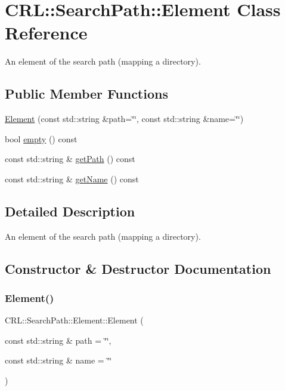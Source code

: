 \hypertarget{classCRL_1_1SearchPath_1_1Element}{}\section{C\+RL\+:\+:Search\+Path\+:\+:Element Class Reference}
\label{classCRL_1_1SearchPath_1_1Element}


An element of the search path (mapping a directory).  


\subsection*{Public Member Functions}
\begin{DoxyCompactItemize}
\item 
\mbox{\hyperlink{classCRL_1_1SearchPath_1_1Element_a285f27a24b1bdc986bd0316794863e45}{Element}} (const std\+::string \&path=\char`\"{}\char`\"{}, const std\+::string \&name=\char`\"{}\char`\"{})
\item 
bool \mbox{\hyperlink{classCRL_1_1SearchPath_1_1Element_ab2ab7a961f0b9fa791f266c8ee63b494}{empty}} () const
\item 
const std\+::string \& \mbox{\hyperlink{classCRL_1_1SearchPath_1_1Element_a91f3e1af2b687e2afe4369ba5882ac89}{get\+Path}} () const
\item 
const std\+::string \& \mbox{\hyperlink{classCRL_1_1SearchPath_1_1Element_a58e738bdc59bd7d5344e9271427b0869}{get\+Name}} () const
\end{DoxyCompactItemize}


\subsection{Detailed Description}
An element of the search path (mapping a directory). 

\subsection{Constructor \& Destructor Documentation}
\mbox{\label{classCRL_1_1SearchPath_1_1Element_a285f27a24b1bdc986bd0316794863e45}} 
\subsubsection{\texorpdfstring{Element()}{Element()}}
{\footnotesize\ttfamily C\+R\+L\+::\+Search\+Path\+::\+Element\+::\+Element (\begin{DoxyParamCaption}\item[{const std\+::string \&}]{path = {\ttfamily \char`\"{}\char`\"{}},  }\item[{const std\+::string \&}]{name = {\ttfamily \char`\"{}\char`\"{}} }\end{DoxyParamCaption})\hspace{0.3cm}{\ttfamily [inline]}}

